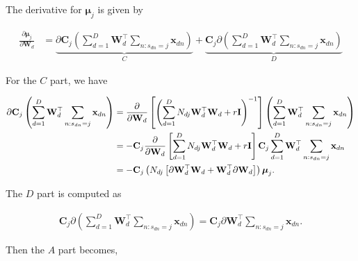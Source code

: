 \documentclass[]{article}
\newcommand{\Cin}{\mathbf{C}_j}
\newcommand{\muJ}{\boldsymbol{\mu}_j}
\newcommand{\indobj}{\mathbf{x}_{dn}}
\newcommand{\projMatI}{\mathbf{W}_d}
\begin{document}
The derivative for $\muJ$ is given by

\begin{align}
\frac{\partial \muJ}{\partial \projMatI} &= \underbrace{\partial\Cin\left(\sum_{d=1}^{D}\projMatI^\top\sum_{n:s_{dn}=j}\indobj\right)}_{C} + \underbrace{\Cin\partial\left(\sum_{d=1}^{D}\projMatI^\top\sum_{n:s_{dn}=j}\indobj\right)}_{D} 
\end{align}

For the $C$ part, we have

\begin{align}
\partial\Cin\left(\sum_{d=1}^{D}\projMatI^\top\sum_{n:s_{dn}=j}\indobj\right) &= \frac{\partial}{\partial \projMatI}\left[\left(\sum_{d=1}^{D}N_{dj}\projMatI^\top\projMatI+r\mathbf{I}\right)^{-1}\right]\left(\sum_{d=1}^{D}\projMatI^\top\sum_{n:s_{dn}=j}\indobj\right) \notag \\
&= -\Cin \frac{\partial}{\partial \projMatI}\left[\sum_{d=1}^{D}N_{dj}\projMatI^\top\projMatI+r\mathbf{I}\right]\Cin\sum_{d=1}^{D}\projMatI^\top\sum_{n:s_{dn}=j}\indobj \notag\\
&=-\Cin\left(N_{dj}\left[\partial\projMatI^\top\projMatI+\projMatI^\top\partial\projMatI\right]\right)\muJ.
\end{align}

The $D$ part is computed as

\begin{align}
\Cin\partial\left(\sum_{d=1}^{D}\projMatI^\top\sum_{n:s_{dn}=j}\indobj\right) = \Cin\partial\projMatI^\top\sum_{n:s_{dn}=j}\indobj.
\end{align}

Then the $A$ part becomes,
\end{document}
